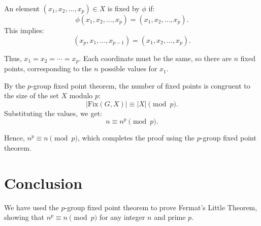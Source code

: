 \documentclass[12pt]{amsart}
\theoremstyle{definition}
\numberwithin{equation}{section}
\begin{document}
\begin{exercise}{5}
    An element \((x_1, x_2, \dots, x_p) \in X\) is fixed by \(\phi \) if:
    \[
    \phi(x_1, x_2, \dots, x_p) = (x_1, x_2, \dots, x_p).
    \]
    This implies:
    \[
    (x_p, x_1, \dots, x_{p-1}) = (x_1, x_2, \dots, x_p).
    \]

    Thus, \(x_1 = x_2 = \cdots = x_p\). Each coordinate must be the same, so there are \(n\) fixed points, corresponding to the \(n\) possible values for \(x_1\).

    By the \(p\)-group fixed point theorem, the number of fixed points is congruent to the size of the set \(X\) modulo \(p\):
    \[
    |\text{Fix}(G, X)| \equiv |X| \pmod{p}.
    \]
    Substituting the values, we get:
    \[
    n \equiv n^p \pmod{p}.
    \]

    Hence, \(n^p \equiv n \pmod{p}\), which completes the proof using the \(p\)-group fixed point theorem.

    \section*{Conclusion}
    We have used the \(p\)-group fixed point theorem to prove Fermat's Little Theorem, showing that \(n^p \equiv n \pmod{p}\) for any integer \(n\) and prime \(p\).

\end{exercise}
\newpage
\end{document}
